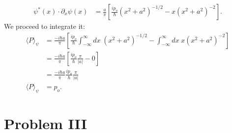 \documentclass[letterpaper,11pt,twoside]{article}
\newcommand{\braket}[1]{\langle#1\rangle}
\begin{document}
\begin{enumerate}[itemsep=0pt,topsep=0pt,label=\alph*.]
\begin{align*}
    \psi^*(x)\cdot\partial_x\psi(x)&=\frac{a}{\pi}\left[\frac{ip_o}{\hbar}(x^2+a^2)^{-1/2}-x(x^2+a^2)^{-2}\right].
  \end{align*}
  We proceed to integrate it:
  \begin{align*}
    \braket{P}_\psi&=\frac{-i\hbar a}{\pi}\left[\frac{ip_o}{\hbar}\int_{-\infty}^\infty dx\;(x^2+a^2)^{-1/2}-\int_{-\infty}^\infty dx\;x(x^2+a^2)^{-2}\right]\\
    &=\frac{-i\hbar a}{\pi}\left[\frac{ip_o}{\hbar}\frac{\pi}{|a|}-0\right]\\
    &=\frac{-i\hbar a}{\pi}\frac{ip_o}{\hbar}\frac{\pi}{|a|}\\
    \braket{P}_\psi&=p_o.
  \end{align*}
  
\end{enumerate}
\section*{Problem III}
\end{document}
